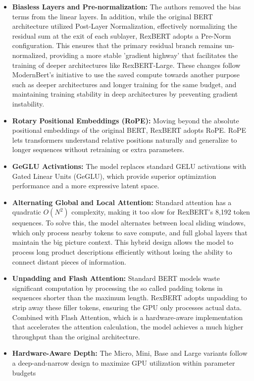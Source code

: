 \documentclass[a4paper,12pt]{article}
\begin{document}
\begin{itemize}
    \item \textbf{Biasless Layers and Pre-normalization:} The authors removed the bias terms from the linear layers. In addition, while the original BERT architecture utilized Post-Layer Normalization, effectively normalizing the residual sum at the exit of each sublayer, RexBERT adopts a Pre-Norm configuration. This ensures that the primary residual branch remains un-normalized, providing a more stable 'gradient highway' that facilitates the training of deeper architectures like RexBERT-Large. These changes follow ModernBert's initiative to use the saved compute towards another purpose such as deeper architectures and longer training for the same budget, and maintaining training stability in deep architectures by preventing gradient instability.
    \item \textbf{Rotary Positional Embeddings (RoPE):} Moving beyond the absolute positional embeddings of the original BERT, RexBERT adopts RoPE. RoPE lets transformers understand relative positions naturally and generalize to longer sequences without retraining or extra parameters.
    \item \textbf{GeGLU Activations:} The model replaces standard GELU activations with Gated Linear Units (GeGLU), which provide superior optimization performance and a more expressive latent space.
    \item \textbf{Alternating Global and Local Attention:} Standard attention has a quadratic $O(N^2)$ complexity, making it too slow for RexBERT's 8,192 token sequences. To solve this, the model alternates between local sliding windows, which only process nearby tokens to save compute, and full global layers that maintain the big picture context. This hybrid design allows the model to process long product descriptions efficiently without losing the ability to connect distant pieces of information.
    \item \textbf{Unpadding and Flash Attention:} Standard BERT models waste significant computation by processing the so called padding tokens in sequences shorter than the maximum length. RexBERT adopts unpadding to strip away these filler tokens, ensuring the GPU only processes actual data. Combined with Flash Attention, which is a hardware-aware implementation that accelerates the attention calculation, the model achieves a much higher throughput than the original architecture.
    \item \textbf{Hardware-Aware Depth:} The Micro, Mini, Base and Large variants follow a deep-and-narrow design to maximize GPU utilization within parameter budgets
\end{itemize}
\end{document}
